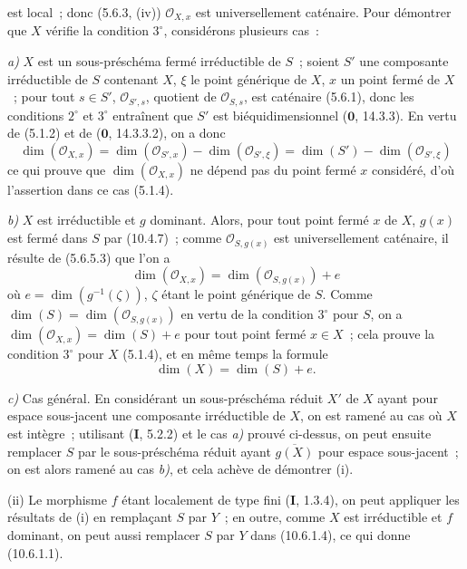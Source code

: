 est local~; donc (5.6.3, (iv)) $\mathcal O_{X,x}$ est universellement caténaire. Pour
démontrer que $X$ vérifie la condition $3^\circ$, considérons plusieurs cas~:

\emph{a)} $X$ est un sous-préschéma fermé irréductible de $S$~; soient $S'$ une
composante irréductible de $S$ contenant $X$, $\xi$ le point générique de $X$,
$x$ un point fermé de $X$~; pour tout $s\in S'$, $\mathcal O_{S',s}$, quotient de
$\mathcal O_{S,s}$, est caténaire (5.6.1), donc les conditions $2^\circ$ et $3^\circ$
entraînent que $S'$ est biéquidimensionnel ($\mathbf 0$, 14.3.3). En vertu de
(5.1.2) et de ($\mathbf 0$, 14.3.3.2), on a donc
\[
  \dim(\mathcal O_{X,x})=\dim(\mathcal O_{S',x})-\dim(\mathcal O_{S',\xi})
  =\dim(S')-\dim(\mathcal O_{S',\xi})
\]
ce qui prouve que $\dim(\mathcal O_{X,x})$ ne dépend pas du point fermé $x$
considéré, d'où l'assertion dans ce cas (5.1.4).

\emph{b)} $X$ est irréductible et $g$ dominant. Alors, pour tout point fermé $x$
de $X$, $g(x)$ est fermé dans $S$ par (10.4.7)~; comme $\mathcal O_{S,g(x)}$ est
universellement caténaire, il résulte de (5.6.5.3) que l'on a
\[
  \dim(\mathcal O_{X,x})=\dim(\mathcal O_{S,g(x)})+e
\]
où $e=\dim(g^{-1}(\zeta))$, $\zeta$ étant le point générique de $S$. Comme
$\dim(S)=\dim(\mathcal O_{S,g(x)})$ en vertu de la condition $3^\circ$ pour $S$, on
a $\dim(\mathcal O_{X,x})=\dim(S)+e$ pour tout point fermé $x\in X$~; cela prouve
la condition $3^\circ$ pour $X$ (5.1.4), et en même temps la formule
\begin{equation}
\label{IV.10.6.1.4-fr}
\tag{10.6.1.4}
\dim(X)=\dim(S)+e.
\end{equation}

\emph{c)} Cas général. En considérant un sous-préschéma réduit $X'$ de $X$ ayant
pour espace sous-jacent une composante irréductible de $X$, on est ramené au cas
où $X$ est intègre~; utilisant (\textbf{I}, 5.2.2) et le cas \emph{a)} prouvé
ci-dessus, on peut ensuite remplacer $S$ par le sous-préschéma réduit ayant
$\overline{g(X)}$ pour espace sous-jacent~; on est alors ramené au cas \emph{b)},
et cela achève de démontrer (i).

(ii) Le morphisme $f$ étant localement de type fini (\textbf{I}, 1.3.4), on peut
appliquer les résultats de (i) en remplaçant $S$ par $Y$~; en outre, comme $X$
est irréductible et $f$ dominant, on peut aussi remplacer $S$ par $Y$ dans
(10.6.1.4), ce qui donne (10.6.1.1).

